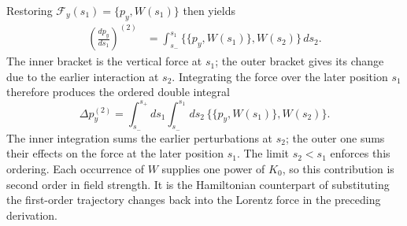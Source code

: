 Restoring $\mathcal F_y(s_1)=\{p_y,W(s_1)\}$ then yields
\begin{align}
 \left(\frac{dp_y}{ds_1}\right)^{(2)}
 &=\int_{s_-}^{s_1}
   \bigl\{\{p_y,W(s_1)\},W(s_2)\bigr\}\,ds_2.
\end{align}
The inner bracket is the vertical force at $s_1$; the outer bracket gives
its change due to the earlier interaction at $s_2$.
Integrating the force over the later
position $s_1$ therefore produces the ordered double integral
\begin{equation}
 \Delta p_y^{(2)}
 =\int_{s_-}^{s_+}ds_1\int_{s_-}^{s_1}ds_2\,
   \bigl\{\{p_y,W(s_1)\},W(s_2)\bigr\}.
 \label{eq:fringe_ordered_second_order_kick}
\end{equation}
The inner integration sums the earlier perturbations at $s_2$; the outer
one sums their effects on the force at the later position $s_1$.
The limit $s_2<s_1$ enforces this ordering. Each occurrence of $W$ supplies
one power of $K_0$, so this contribution is second order in field strength.
It is the Hamiltonian counterpart of substituting the first-order trajectory
changes back into the Lorentz force in the preceding derivation.


